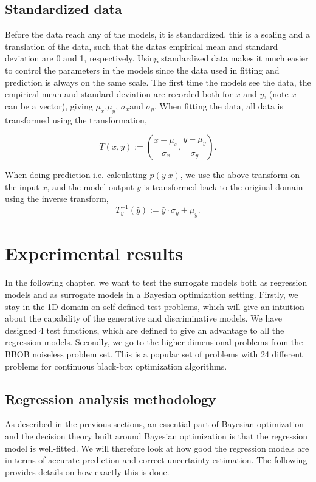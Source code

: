 \section{Standardized data}
Before the data reach any of the models, it is standardized. this is a scaling and a translation
of the data, such that the datas empirical mean and standard deviation are 0 and 1,
respectively. Using standardized data makes it much easier to control the parameters in the models
since the data used in fitting and prediction is always on the same scale. The first time the models
see the data, the empirical mean and standard deviation are recorded both for $x$ and $y$, (note $x$
can be a vector), giving $\mu_x$,$\mu_y$, $\sigma_x$and $\sigma_y$. When fitting the data, all data
is transformed using the transformation, 

$$T(x,y) := \left(\frac{x-\mu_x}{\sigma_x}, \frac{y-\mu_y}{\sigma_y} \right).$$

When doing prediction i.e. calculating $p(y|x)$, we use the above transform on the input $x$, and
the model output $y$ is transformed back to the original domain using the inverse transform, 
$$T^{-1}_y(\hat y) :=\hat y \cdot \sigma_y+\mu_y.$$

 \chapter{Experimental results}
 In the following chapter, we want to test the surrogate models both as regression models and as surrogate
 models in a Bayesian optimization setting. Firstly, we stay in the 1D domain on self-defined test problems, 
 which will give an intuition about the capability of the generative and discriminative models. 
We have designed 4 test functions, which are defined to give an advantage to all the regression models. Secondly, 
we go to the higher dimensional problems from the BBOB noiseless problem set. This is a popular set of problems 
with 24 different problems for continuous black-box optimization algorithms.

 \section{Regression analysis methodology}
 As described in the previous sections, an essential part of Bayesian optimization and the decision
 theory built around Bayesian optimization is that the regression model is well-fitted. We will therefore
 look at how good the regression models are in terms of accurate prediction and 
 correct uncertainty estimation. The following provides details on how exactly this is done. 

